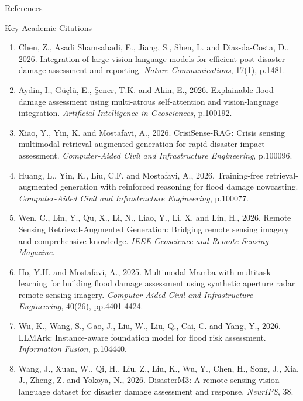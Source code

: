 \documentclass[aspectratio=169, 10pt, professionalfonts]{beamer}
\begin{document}
\begin{frame}{References}
  \begin{block}{Key Academic Citations}
    \tiny
    \begin{enumerate}\setlength{\itemsep}{0.3em}
      \item Chen, Z., Asadi Shamsabadi, E., Jiang, S., Shen, L. and Dias-da-Costa, D., 2026. Integration of large vision language models for efficient post-disaster damage assessment and reporting. \textit{Nature Communications}, 17(1), p.1481.
      \item Aydin, I., Güçlü, E., Şener, T.K. and Akin, E., 2026. Explainable flood damage assessment using multi-atrous self-attention and vision-language integration. \textit{Artificial Intelligence in Geosciences}, p.100192.
      \item Xiao, Y., Yin, K. and Mostafavi, A., 2026. CrisiSense-RAG: Crisis sensing multimodal retrieval-augmented generation for rapid disaster impact assessment. \textit{Computer-Aided Civil and Infrastructure Engineering}, p.100096.
      \item Huang, L., Yin, K., Liu, C.F. and Mostafavi, A., 2026. Training-free retrieval-augmented generation with reinforced reasoning for flood damage nowcasting. \textit{Computer-Aided Civil and Infrastructure Engineering}, p.100077.
      \item Wen, C., Lin, Y., Qu, X., Li, N., Liao, Y., Li, X. and Lin, H., 2026. Remote Sensing Retrieval-Augmented Generation: Bridging remote sensing imagery and comprehensive knowledge. \textit{IEEE Geoscience and Remote Sensing Magazine}.
      \item Ho, Y.H. and Mostafavi, A., 2025. Multimodal Mamba with multitask learning for building flood damage assessment using synthetic aperture radar remote sensing imagery. \textit{Computer-Aided Civil and Infrastructure Engineering}, 40(26), pp.4401-4424.
      \item Wu, K., Wang, S., Gao, J., Liu, W., Liu, Q., Cai, C. and Yang, Y., 2026. LLMArk: Instance-aware foundation model for flood risk assessment. \textit{Information Fusion}, p.104440.
      \item Wang, J., Xuan, W., Qi, H., Liu, Z., Liu, K., Wu, Y., Chen, H., Song, J., Xia, J., Zheng, Z. and Yokoya, N., 2026. DisasterM3: A remote sensing vision-language dataset for disaster damage assessment and response. \textit{NeurIPS}, 38.
    \end{enumerate}
  \end{block}
\end{frame}
\end{document}
